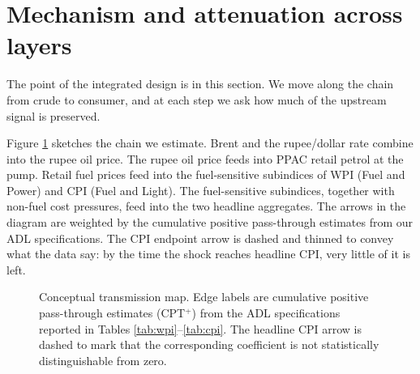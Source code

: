 \documentclass[11pt,a4paper]{article}
\begin{document}
\section{Mechanism and attenuation across layers}
\label{sec:mech}

The point of the integrated design is in this section. We move along the chain from crude to consumer, and at each step we ask how much of the upstream signal is preserved.

Figure \ref{fig:map} sketches the chain we estimate. Brent and the rupee/dollar rate combine into the rupee oil price. The rupee oil price feeds into PPAC retail petrol at the pump. Retail fuel prices feed into the fuel-sensitive subindices of WPI (Fuel and Power) and CPI (Fuel and Light). The fuel-sensitive subindices, together with non-fuel cost pressures, feed into the two headline aggregates. The arrows in the diagram are weighted by the cumulative positive pass-through estimates from our ADL specifications. The CPI endpoint arrow is dashed and thinned to convey what the data say: by the time the shock reaches headline CPI, very little of it is left.

\begin{figure}[t]
\centering
{}
\caption{Conceptual transmission map. Edge labels are cumulative positive pass-through estimates (CPT$^+$) from the ADL specifications reported in Tables \ref{tab:wpi}--\ref{tab:cpi}. The headline CPI arrow is dashed to mark that the corresponding coefficient is not statistically distinguishable from zero.}
\label{fig:map}
\end{figure}
\end{document}
